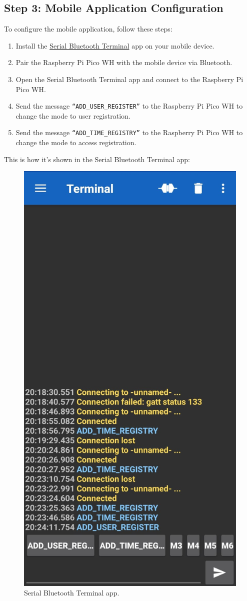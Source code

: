 \documentclass{article}
\begin{document}
\subsection{Step 3: Mobile Application Configuration}
To configure the mobile application, follow these steps:
\begin{enumerate}
    \item Install the \href{https://play.google.com/store/apps/details?id=de.kai_morich.serial_usb_terminal&pcampaignid=web_share}{Serial Bluetooth Terminal} app on your mobile device.
    \item Pair the Raspberry Pi Pico WH with the mobile device via Bluetooth.
    \item Open the Serial Bluetooth Terminal app and connect to the Raspberry Pi Pico WH.
    \item Send the message \texttt{``ADD\_USER\_REGISTER''} to the Raspberry Pi Pico WH to change the mode to user registration.
    \item Send the message \texttt{``ADD\_TIME\_REGISTRY''} to the Raspberry Pi Pico WH to change the mode to access registration.
\end{enumerate}
This is how it's shown in the Serial Bluetooth Terminal app:
\begin{figure}[H]
    \centering
    \includegraphics[width=0.5\linewidth]{../images/serial_bluetooth_terminal.jpeg}
    \caption{\label{fig:serial_bluetooth_terminal}Serial Bluetooth Terminal app.}
\end{figure}
\end{document}
